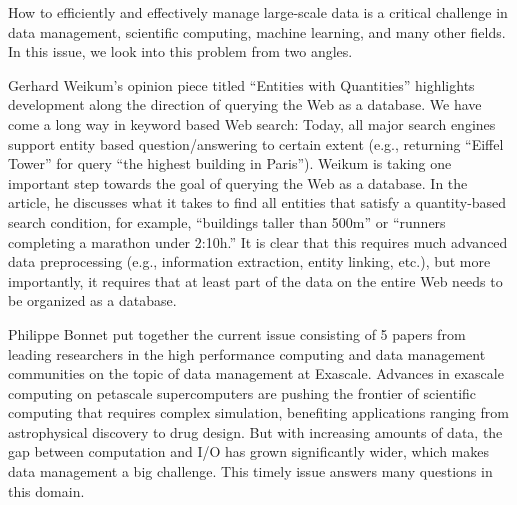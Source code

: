 \documentclass[11pt]{article}
\begin{document}
How to efficiently and effectively manage large-scale data is a
critical challenge in data management, scientific computing, machine
learning, and many other fields. In this issue, we look into this
problem from two angles.

Gerhard Weikum's opinion piece titled ``Entities with Quantities''
highlights development along the direction of querying the Web as a
database. We have come a long way in keyword based Web search: Today,
all major search engines support entity based question/answering to
certain extent (e.g., returning ``Eiffel Tower'' for query ``the
highest building in Paris''). Weikum is taking one important step
towards the goal of querying the Web as a database. In the article, he
discusses what it takes to find all entities that satisfy a
quantity-based search condition, for example, ``buildings taller than
500m'' or ``runners completing a marathon under 2:10h.''  It is clear
that this requires much advanced data preprocessing (e.g., information
extraction, entity linking, etc.), but more importantly, it requires
that at least part of the data on the entire Web needs to be organized
as a database.

Philippe Bonnet put together the current issue consisting of 5 papers
from leading researchers in the high performance computing and data
management communities on the topic of data management at
Exascale. Advances in exascale computing on petascale supercomputers
are pushing the frontier of scientific computing that requires complex
simulation, benefiting applications ranging from astrophysical
discovery to drug design. But with increasing amounts of data, the gap
between computation and I/O has grown significantly wider, which makes
data management a big challenge. This timely issue answers many
questions in this domain.
\end{document}
